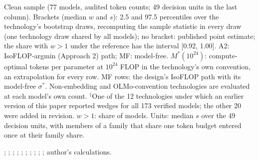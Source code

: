 \begin{table}[tp]
\begin{tablenotes}
Clean sample (77 models, audited token counts; 49 decision units in the last column). Brackets (median $w$ and $s$): 2.5 and 97.5 percentiles over the technology's bootstrap draws, recomputing the sample statistic in every draw (one technology draw shared by all models); no bracket: published point estimate; the share with $w>1$ under the reference has the interval [0.92, 1.00]. A2: IsoFLOP-argmin (Approach 2) path; MF: model-free. $M^*(10^{24})$: compute-optimal tokens per parameter at $10^{24}$ FLOP in the technology's own convention, an extrapolation for every row. MF rows: the design's IsoFLOP path with its model-free $\sigma^*$. Non-embedding and OLMo-convention technologies are evaluated at each model's own count. $^\dagger$One of the 12 technologies under which an earlier version of this paper reported wedges for all 173 verified models; the other 20 were added in revision. $w>1$: share of models. Units: median $s$ over the 49 decision units, with members of a family that share one token budget entered once at their family share.
\end{tablenotes}
\begin{tablenotes}[Source]
\citet{hoffmann2022training}; \citet{besiroglu2024chinchilla}; \citet{li2025predictableb}; \citet{gadre2024language};
\citet{bhagia2024establishing}; \citet{muennighoff2023scaling}; \citet{grattafiori2024llama}; \citet{marin2026ladders};
\citet{bi2024deepseek}; \citet{hu2024minicpm}; author's calculations.
\end{tablenotes}
\end{table}
